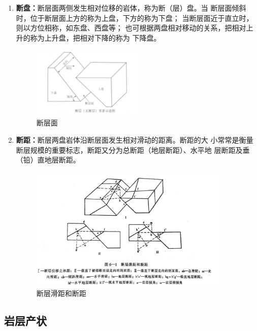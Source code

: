 \documentclass[a4paper,twoside]{ctexart}
\begin{document}
\begin{enumerate}
\item \textbf{断盘：}断层面两侧发生相对位移的岩体，称为断（层）盘。当
  断层面倾斜时，位于断层面上方的称为上盘，下方的称为下盘；
  当断层面近于直立时，则以方位相称，如东盘、西盘等；
  也可根据两盘相对移动的关系，把相对上升的称为上升盘，把相对下降的称为
  下降盘。

  \begin{figure}[htbp]
  \centering
    \includegraphics[width=0.5\textwidth]{pic/断层面.png}
  \caption{断层面}
  \label{fig:断层面}
\end{figure}

\item \textbf{断距：}断层两盘岩体沿断层面发生相对滑动的距离。断距的大
  小常常是衡量断层规模的重要标志，断距又分为总断距（地层断距）、水平地
  层断距及垂（铅）直地层断距。

  
\begin{figure}[htbp]
  \centering
    \includegraphics[width=0.9\textwidth]{pic/断层滑距和断距.png}
  \caption{断层滑距和断距}
  \label{fig:断层滑距和断距}
\end{figure}

\end{enumerate}



\subsection{岩层产状}
\end{document}
